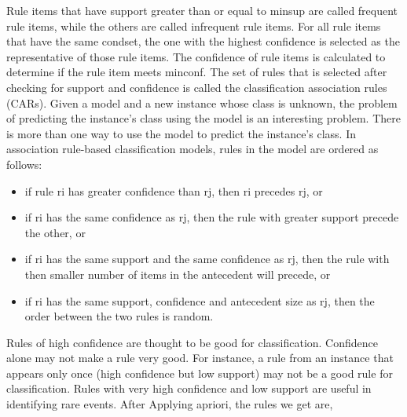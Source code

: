 \documentclass[12pt]{article}
\renewcommand{\_}{\kern-1.5pt\textunderscore\kern-1.5pt}
\begin{document}
 Rule items that have support greater than or equal to minsup are called frequent rule items, while the others are called infrequent rule items. For all rule items that have the same condset, the one with the highest confidence is selected as the representative of those rule items. The confidence of rule items is calculated to determine if the rule item meets minconf. The set of rules that is selected after checking for support and confidence is called the classification association rules (CARs). Given a model and a new instance whose class is unknown, the problem of predicting the instance’s class using the model is an interesting problem. There is more than one way to use the model to predict the instance’s class. In association rule-based classification models, rules in the model are ordered as follows:\par

\begin{itemize}
	\item if rule ri has greater confidence than rj, then ri precedes rj, or\par

	\item if ri has the same confidence as rj, then the rule with greater support precede the other, or\par

	\item if ri has the same support and the same confidence as rj, then the rule with then smaller number of items in the antecedent will precede, or\par

	\item if ri has the same support, confidence and antecedent size as rj, then the order between the two rules is random.
\end{itemize}\par

\begin{adjustwidth}{0.03in}{0.0in}
Rules of high confidence are thought to be good for classification. Confidence alone may not make a rule very good. For instance, a rule from an instance that appears only once (high confidence but low support) may not be a good rule for classification. Rules with very high confidence and low support are useful in identifying rare events. After Applying apriori, the rules we get are,\par

\end{adjustwidth}
\end{document}
